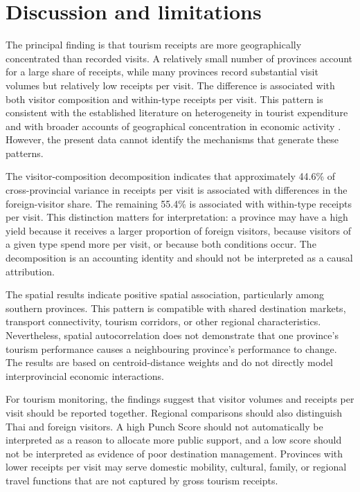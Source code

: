\documentclass[11pt,a4paper]{article}
\theoremstyle{plain}\newtheorem{proposition}{Proposition}
\theoremstyle{definition}\newtheorem{definition}{Definition}
\begin{document}
\section{Discussion and limitations}
The principal finding is that tourism receipts are more geographically concentrated than recorded visits. A relatively small number of provinces account for a large share of receipts, while many provinces record substantial visit volumes but relatively low receipts per visit. The difference is associated with both visitor composition and within-type receipts per visit. This pattern is consistent with the established literature on heterogeneity in tourist expenditure \citep{wang2010,brida2013} and with broader accounts of geographical concentration in economic activity \citep{krugman1991}. However, the present data cannot identify the mechanisms that generate these patterns.

The visitor-composition decomposition indicates that approximately 44.6\% of cross-provincial variance in receipts per visit is associated with differences in the foreign-visitor share. The remaining 55.4\% is associated with within-type receipts per visit. This distinction matters for interpretation: a province may have a high yield because it receives a larger proportion of foreign visitors, because visitors of a given type spend more per visit, or because both conditions occur. The decomposition is an accounting identity and should not be interpreted as a causal attribution.

The spatial results indicate positive spatial association, particularly among southern provinces. This pattern is compatible with shared destination markets, transport connectivity, tourism corridors, or other regional characteristics. Nevertheless, spatial autocorrelation does not demonstrate that one province's tourism performance causes a neighbouring province's performance to change. The results are based on centroid-distance weights and do not directly model interprovincial economic interactions.

For tourism monitoring, the findings suggest that visitor volumes and receipts per visit should be reported together. Regional comparisons should also distinguish Thai and foreign visitors. A high Punch Score should not automatically be interpreted as a reason to allocate more public support, and a low score should not be interpreted as evidence of poor destination management. Provinces with lower receipts per visit may serve domestic mobility, cultural, family, or regional travel functions that are not captured by gross tourism receipts.
\end{document}

